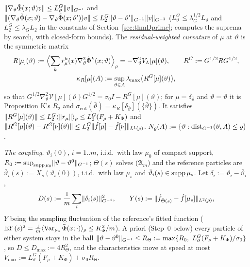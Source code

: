$\lVert \nabla_\vartheta\tilde\Phi(x;\vartheta)v\rVert\le L_\vartheta^G\lVert v\rVert_{G^{-1}}$ and
$\lVert (\nabla_\vartheta\tilde\Phi(x;\vartheta) - \nabla_\vartheta\tilde\Phi(x;\vartheta'))v\rVert
\le L_2^G\lVert \vartheta - \vartheta'\rVert_{G^{-1}}\lVert v\rVert_{G^{-1}}$ ($L_\vartheta^G\le\lambda_G^{1/2}L_\vartheta$ and
$L_2^G\le\lambda_GL_2$ in the constants of Section~\ref{sec:thmDprime};
 computes the suprema by search, with closed-form bounds). The
\emph{residual-weighted curvature} of $\mu$ at $\vartheta$ is the symmetric matrix
\begin{gather*}
  R[\mu](\vartheta) := \Bigl\langle\sum_kr_\mu^k(x)\nabla^2_\vartheta\tilde\Phi^k(x;\vartheta)\Bigr\rangle_\rho
  = -\nabla^2_\vartheta V_L[\mu](\vartheta),\qquad R^G := G^{1/2}RG^{1/2},\\
  \kappa_R[\mu](A) := \sup_{\vartheta\in A}\lambda_{\max}\bigl(R^G[\mu](\vartheta)\bigr),
\end{gather*}
so that $G^{1/2}\nabla^2_\vartheta\mathcal{V}[\mu](\vartheta)G^{1/2} = \sigma_0I - R^G[\mu](\vartheta)$; for
$\mu = \delta_{\bar\vartheta}$ and $\vartheta = \bar\vartheta$ it is Proposition K's $R_2$ and
$\sigma_{\mathrm{crit}}(\bar\vartheta) = \kappa_R[\delta_{\bar\vartheta}](\{\bar\vartheta\})$. It satisfies
$\lVert R^G[\mu](\vartheta)\rVert\le L_2^G\langle\lVert r_\mu\rVert\rangle_\rho\le L_2^G(F_\rho + K_\Phi)$ and
$\lVert R^G[\mu](\vartheta) - R^G[\nu](\vartheta)\rVert\le L_2^G\lVert \hat f[\mu] - \hat f[\nu]\rVert_{L^1(\rho)}$.
$N_\varrho(A) := \{\vartheta : \operatorname{dist}_{G^{-1}}(\vartheta,A)\le\varrho\}$.

\smallskip
\noindent\emph{The coupling.} $\vartheta_i(0)$, $i = 1..m$, i.i.d.\ with law $\mu_0$ of compact support,
$R_0 := \sup_{\operatorname{supp}\mu_0}\lVert \vartheta - \vartheta^0\rVert_{G^{-1}}$; $\Theta(s)$ solves \textup{($\mathfrak{A}_m$)} and
the reference particles are $\bar\vartheta_i(s) := X_s(\vartheta_i(0))$, i.i.d.\ with law $\mu_s$ and
$\bar\vartheta_i(s)\in\operatorname{supp}\mu_s$. Let $\delta_i := \vartheta_i - \bar\vartheta_i$,
\[
  D(s) := \frac1m\sum_i\lVert \delta_i(s)\rVert^2_{G^{-1}},\qquad
  Y(s) := \lVert \hat f_{\bar\Theta(s)} - \hat f[\mu_s]\rVert_{L^2(\rho)},
\]
$Y$ being the sampling fluctuation of the reference's fitted function
($\mathbb{E} Y(s)^2 = \frac1m\langle\operatorname{Var}_{\mu_s}\tilde\Phi(x;\cdot)\rangle_\rho\le K_\Phi^2/m$). A priori
(Step~0 below) every particle of either system stays in the ball
$\lVert \vartheta - \vartheta^0\rVert_{G^{-1}}\le R_\Theta := \max\{R_0,\ L_\vartheta^G(F_\rho + K_\Phi)/\sigma_0\}$, so
$D\le D_{\max} := 4R_\Theta^2$, and the characteristics move at speed at most
$V_{\max} := L_\vartheta^G(F_\rho + K_\Phi) + \sigma_0R_\Theta$.

